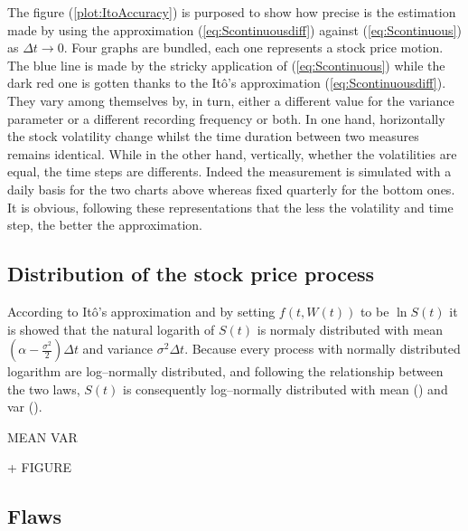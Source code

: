 \documentclass[12pt]{report}
\newcommand{\Bm}{W\left(t\right)}
\newcommand{\Dt}{\Delta t}
\newcommand{\ft}{f\left(t, \Bm \right)}
\newcommand{\St}{S\left(t\right)}
\begin{document}
The figure (\ref{plot:ItoAccuracy}) is purposed to show how precise is the estimation made by using the approximation (\ref{eq:Scontinuousdiff}) against (\ref{eq:Scontinuous}) as $\Dt \to 0$.
Four graphs are bundled, each one represents a stock price motion. The blue line is made by the stricky application of (\ref{eq:Scontinuous}) while the dark red one is gotten thanks to the Itô's approximation (\ref{eq:Scontinuousdiff}).
They vary among themselves by, in turn, either a different value for the variance parameter or a different recording frequency or both.
In one hand, horizontally the stock volatility change whilst the time duration between two measures remains identical. 
While in the other hand, vertically, whether the volatilities are equal, the time steps are differents. Indeed the measurement is simulated with a daily basis for the two charts above whereas fixed quarterly for the bottom ones.
It is obvious, following these representations that the less the volatility and time step, the better the approximation. 

\subsection{Distribution of the stock price process}
\label{sub:Distribution of the stock price process}

According to Itô's approximation and by setting $\ft$ to be $\ln{\St}$ it is showed that the natural logarith of $\St$ is normaly distributed with mean
$\left(\alpha - \frac{\sigma^2}{2}\right) \Dt$ and variance $\sigma^2 \Dt$.
Because every process with normally distributed logarithm are log--normally distributed, and following the relationship between the two laws, $\St$ is consequently log--normally distributed with mean () and var ().

MEAN
VAR


+ FIGURE
\subsection{Flaws}
\label{sub:Flaws}



\end{document}
